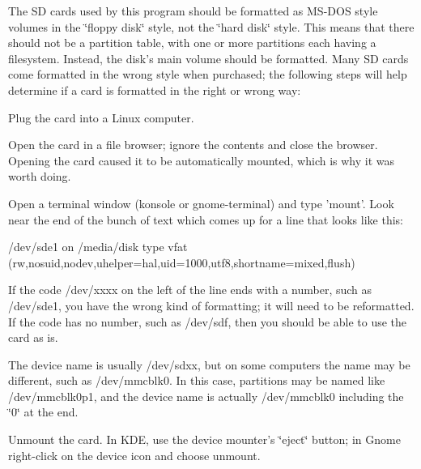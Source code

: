 The S\-D cards used by this program should be formatted as M\-S-\/\-D\-O\-S style volumes in the \char`\"{}floppy disk\char`\"{} style, not the \char`\"{}hard disk\char`\"{} style. This means that there should not be a partition table, with one or more partitions each having a filesystem. Instead, the disk's main volume should be formatted. Many S\-D cards come formatted in the wrong style when purchased; the following steps will help determine if a card is formatted in the right or wrong way\-: \begin{DoxyItemize}
\item Plug the card into a Linux computer. \item Open the card in a file browser; ignore the contents and close the browser. Opening the card caused it to be automatically mounted, which is why it was worth doing. \item Open a terminal window (konsole or gnome-\/terminal) and type 'mount'. Look near the end of the bunch of text which comes up for a line that looks like this\-: \par
 {\ttfamily /dev/sde1 on /media/disk type vfat (rw,nosuid,nodev,uhelper=hal,uid=1000,utf8,shortname=mixed,flush)} \item If the code {\ttfamily /dev/xxxx} on the left of the line ends with a number, such as {\ttfamily /dev/sde1}, you have the wrong kind of formatting; it will need to be reformatted. If the code has no number, such as {\ttfamily /dev/sdf}, then you should be able to use the card as is. \item The device name is usually {\ttfamily /dev/sdxx}, but on some computers the name may be different, such as {\ttfamily /dev/mmcblk0}. In this case, partitions may be named like {\ttfamily /dev/mmcblk0p1}, and the device name is actually {\ttfamily /dev/mmcblk0} including the \char`\"{}0\char`\"{} at the end. \item Unmount the card. In K\-D\-E, use the device mounter's \char`\"{}eject\char`\"{} button; in Gnome right-\/click on the device icon and choose unmount.\end{DoxyItemize}
